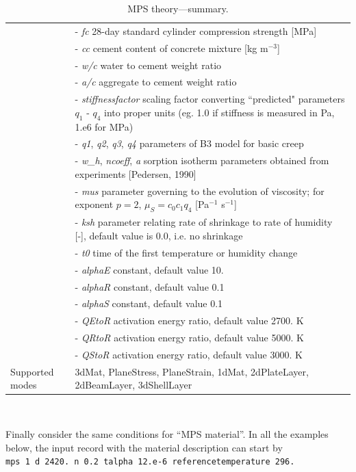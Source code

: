 \documentclass[a4paper]{article}
\newcommand{\param}[1]{{\it #1}}
\newenvironment{mmt}{\begin{tabular}{|l|p{9cm}|}}{\end{tabular}\\}
\newenvironment{mmt}{\begin{tabular}{|l|l|}}{\end{tabular}\\}
\begin{document}
\begin{table}[!htb]
\begin{mmt}
\hline
%
&- \param{fc} 28-day standard cylinder compression strength [MPa]\\
&- \param{cc} cement content of concrete mixture  [kg m$^{-3}$] \\
&- \param{w/c} water to cement weight ratio\\
&- \param{a/c} aggregate to cement weight ratio\\
&- \param{stiffnessfactor} scaling factor converting ``predicted" parameters $q_1$ - $q_4$ into proper units (eg. 1.0 if stiffness is measured in Pa, 1.e6 for MPa)\\
&- \param{q1}, \param{q2}, \param{q3}, \param{q4} parameters of B3 model for basic creep\\
&- \param{w\_h}, \param{ncoeff}, \param{a} sorption isotherm parameters obtained from experiments [Pedersen, 1990] \\
%
&- \param{mus} parameter governing to the evolution of viscosity; for exponent $p=2$, $\mu_S = c_0 c_1 q_4$ [Pa$^{-1}$ s$^{-1}$] \\
&- \param{ksh} parameter relating rate of shrinkage to rate of humidity [-], default value is 0.0, i.e. no shrinkage\\
&- \param{t0} time of the first temperature or humidity change\\
&- \param{alphaE} constant, default value 10.\\
&- \param{alphaR} constant, default value 0.1\\
&- \param{alphaS} constant, default value 0.1\\
&- \param{QEtoR} activation energy ratio, default value 2700. K\\
&- \param{QRtoR} activation energy ratio, default value 5000. K\\
&- \param{QStoR} activation energy ratio, default value 3000. K\\
%
Supported modes& 3dMat, PlaneStress, PlaneStrain, 1dMat,
2dPlateLayer, 2dBeamLayer, 3dShellLayer\\
\hline
\end{mmt}

\caption{MPS theory---summary.}
\label{mps_table}

\end{table}


Finally consider the same conditions for ``MPS material''.
In all the examples below,
the input record with the material description can start by\\
{\tt mps 1 d 2420. n 0.2 talpha 12.e-6 referencetemperature 296.}
\end{document}
